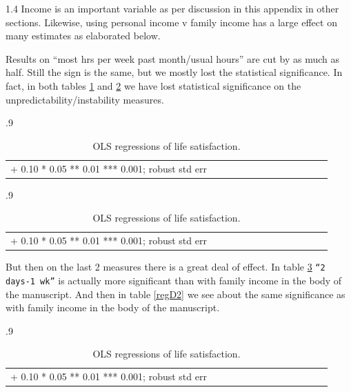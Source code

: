 \documentclass[10pt, letterpaper]{article}
\begin{document}
\begin{spacing}{1.4}
Income is an important variable as per discussion in this appendix in other
sections. Likewise, using personal income v family income has a large effect on
many estimates as elaborated below. 

Results on ``most hrs per week past month/usual hours'' are cut by as much as half. Still the sign is the same, but we mostly lost the statistical significance. In fact, in both tables \ref{a2} and \ref{b2} we have lost
statistical significance on the unpredictability/instability measures. 


\begin{spacing}{.9} \begin{table}[H]\centering   \begin{scriptsize} \begin{tabular}{p{1.8in}p{.5in}p{.5in}p{.5in}p{.5in}p{.5in}p{.5in}p{.5in}p{.5in}p{.5in}p{.5 in}p{.5in}p{.5 in}}\hline  \hline + 0.10 * 0.05 ** 0.01 *** 0.001; robust std err \end{tabular}\end{scriptsize}\caption{\label{a2}OLS regressions of life satisfaction.}\end{table} \end{spacing}

\begin{spacing}{.9} \begin{table}[H]\centering   \begin{scriptsize} \begin{tabular}{p{1.8in}p{.5in}p{.5in}p{.5in}p{.5in}p{.5in}p{.5in}p{.5in}p{.5in}p{.5in}p{.5 in}p{.5in}p{.5 in}}\hline  \hline + 0.10 * 0.05 ** 0.01 *** 0.001; robust std err \end{tabular}\end{scriptsize}\caption{\label{b2}OLS regressions of life satisfaction.}\end{table} \end{spacing}

But then on the last 2 measures there is a great deal of effect. In table
\ref{regC2} \texttt{``2 days-1 wk''} is actually more significant than with
family income in the body of the manuscript.  And then in table \ref{regD2} we
see about the same significance as with family income in the body of the manuscript. 

\begin{spacing}{.9} \begin{table}[H]\centering   \begin{scriptsize} \begin{tabular}{p{1.8in}p{.5in}p{.5in}p{.5in}p{.5in}p{.5in}p{.5in}p{.5in}p{.5in}p{.5in}p{.5 in}p{.5in}p{.5 in}}\hline  \hline + 0.10 * 0.05 ** 0.01 *** 0.001; robust std err \end{tabular}\end{scriptsize}\caption{\label{regC2}OLS regressions of life satisfaction.}\end{table} \end{spacing}




\end{spacing}
\end{document}

